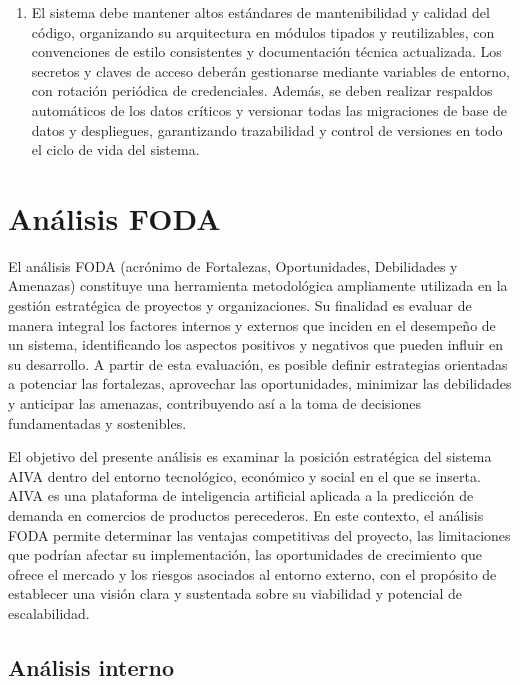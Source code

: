 \begin{enumerate}[label=RNF-\arabic*., leftmargin=*, nosep]
  \item El sistema debe mantener altos estándares de mantenibilidad y calidad del código, organizando su arquitectura en módulos tipados y reutilizables, con convenciones de estilo consistentes y documentación técnica actualizada. Los secretos y claves de acceso deberán gestionarse mediante variables de entorno, con rotación periódica de credenciales. Además, se deben realizar respaldos automáticos de los datos críticos y versionar todas las migraciones de base de datos y despliegues, garantizando trazabilidad y control de versiones en todo el ciclo de vida del sistema.

\end{enumerate}

\section{Análisis FODA}\label{sec:foda}

El análisis FODA (acrónimo de Fortalezas, Oportunidades, Debilidades y Amenazas) constituye una herramienta metodológica ampliamente utilizada en la gestión estratégica de proyectos y organizaciones. Su finalidad es evaluar de manera integral los factores internos y externos que inciden en el desempeño de un sistema, identificando los aspectos positivos y negativos que pueden influir en su desarrollo. A partir de esta evaluación, es posible definir estrategias orientadas a potenciar las fortalezas, aprovechar las oportunidades, minimizar las debilidades y anticipar las amenazas, contribuyendo así a la toma de decisiones fundamentadas y sostenibles.

El objetivo del presente análisis es examinar la posición estratégica del sistema AIVA dentro del entorno tecnológico, económico y social en el que se inserta. AIVA es una plataforma de inteligencia artificial aplicada a la predicción de demanda en comercios de productos perecederos. En este contexto, el análisis FODA permite determinar las ventajas competitivas del proyecto, las limitaciones que podrían afectar su implementación, las oportunidades de crecimiento que ofrece el mercado y los riesgos asociados al entorno externo, con el propósito de establecer una visión clara y sustentada sobre su viabilidad y potencial de escalabilidad.

\subsection{Análisis interno}

